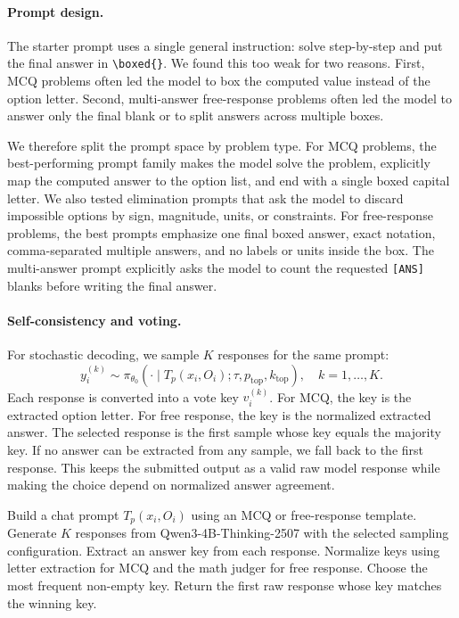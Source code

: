 \documentclass{article}
\newcommand{\model}{Qwen3-4B-Thinking-2507}
\begin{document}
\paragraph{Prompt design.}
The starter prompt uses a single general instruction: solve step-by-step and put the final answer in \verb|\boxed{}|. We found this too weak for two reasons. First, MCQ problems often led the model to box the computed value instead of the option letter. Second, multi-answer free-response problems often led the model to answer only the final blank or to split answers across multiple boxes.

We therefore split the prompt space by problem type. For MCQ problems, the best-performing prompt family makes the model solve the problem, explicitly map the computed answer to the option list, and end with a single boxed capital letter. We also tested elimination prompts that ask the model to discard impossible options by sign, magnitude, units, or constraints. For free-response problems, the best prompts emphasize one final boxed answer, exact notation, comma-separated multiple answers, and no labels or units inside the box. The multi-answer prompt explicitly asks the model to count the requested \texttt{[ANS]} blanks before writing the final answer.

\paragraph{Self-consistency and voting.}
For stochastic decoding, we sample $K$ responses for the same prompt:
\begin{equation}
  y_i^{(k)} \sim \pi_{\theta_0}(\cdot \mid T_p(x_i,O_i); \tau, p_{\mathrm{top}}, k_{\mathrm{top}}),
  \quad k=1,\ldots,K.
\end{equation}
Each response is converted into a vote key $v_i^{(k)}$. For MCQ, the key is the extracted option letter. For free response, the key is the normalized extracted answer. The selected response is the first sample whose key equals the majority key. If no answer can be extracted from any sample, we fall back to the first response. This keeps the submitted output as a valid raw model response while making the choice depend on normalized answer agreement.

\begin{algorithm}[H]
\caption{Inference with extraction-level self-consistency}
\label{alg:sc}
\begin{algorithmic}[1]
\STATE Build a chat prompt $T_p(x_i,O_i)$ using an MCQ or free-response template.
\STATE Generate $K$ responses from \model{} with the selected sampling configuration.
\STATE Extract an answer key from each response.
\STATE Normalize keys using letter extraction for MCQ and the math judger for free response.
\STATE Choose the most frequent non-empty key.
\STATE Return the first raw response whose key matches the winning key.
\end{algorithmic}
\end{algorithm}
\end{document}

